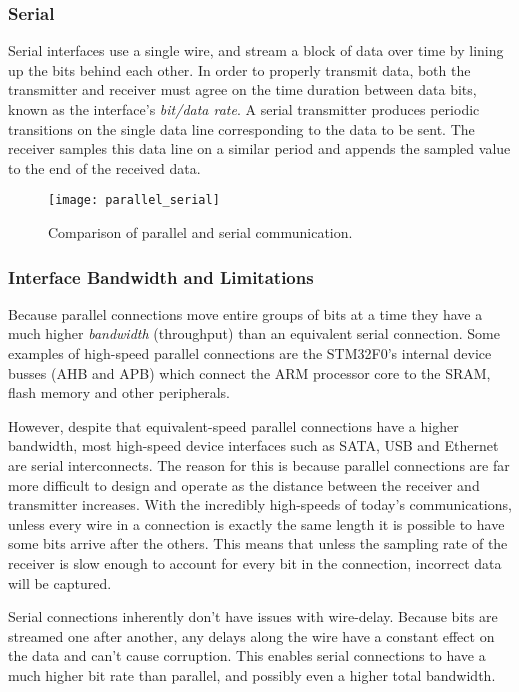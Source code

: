 \documentclass[11pt,fleqn]{book} %
\begin{document}
\subsubsection{Serial}
Serial interfaces use a single wire, and stream a block of data over time by lining up the bits behind each other. In order to properly transmit data, both the transmitter and receiver must agree on the time duration between data bits, known as the interface's \textit{bit/data rate}. A serial transmitter produces periodic transitions on the single data line corresponding to the data to be sent. The receiver samples this data line on a similar period and appends the sampled value to the end of the received data. 

\begin{figure}[]
    \centering\texttt{[image: parallel\_serial]}
    \caption{Comparison of parallel and serial communication.}
    \label{parallel_serial}
\end{figure}

\subsubsection{Interface Bandwidth and Limitations}
Because parallel connections move entire groups of bits at a time they have a much higher \textit{bandwidth} (throughput) than an equivalent serial connection. Some examples of high-speed parallel connections are the STM32F0's internal device busses (AHB and APB) which connect the ARM processor core to the SRAM, flash memory and other peripherals.

However, despite that equivalent-speed parallel connections have a higher bandwidth, most high-speed device interfaces such as SATA, USB and Ethernet are serial interconnects. The reason for this is because parallel connections are far more difficult to design and operate as the distance between the receiver and transmitter increases. With the incredibly high-speeds of today's communications, unless every wire in a connection is exactly the same length it is possible to have some bits arrive after the others. This means that unless the sampling rate of the receiver is slow enough to account for every bit in the connection, incorrect data will be captured.

Serial connections inherently don't have issues with wire-delay. Because bits are streamed one after another, any delays along the wire have a constant effect on the data and can't cause corruption. This enables serial connections to have a much higher bit rate than parallel, and possibly even a higher total bandwidth.
\end{document}
